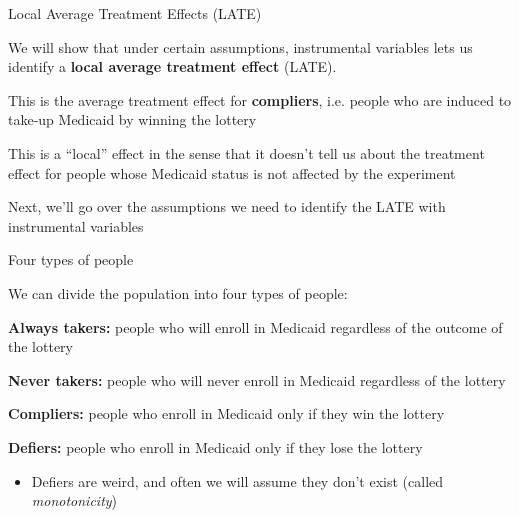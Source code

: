 \documentclass[11pt,english,handout]{beamer}
\newenvironment{wideitemize}{\itemize\addtolength{\itemsep}{10pt}}{\enditemize}
\begin{document}
	\begin{frame}{Local Average Treatment Effects (LATE)}
	
	
	\begin{wideitemize}

		\item
		We will show that under certain assumptions, instrumental variables lets us identify a \textbf{local average treatment effect} (LATE).
		
		\pause
		\item
		This is the average treatment effect for \textbf{compliers}, i.e. people who are induced to take-up Medicaid by winning the lottery
		
		\pause
		\item
		This is a ``local'' effect in the sense that it doesn't tell us about the treatment effect for people whose Medicaid status is not affected by the experiment

		\pause
		\item
		Next, we'll go over the assumptions we need to identify the LATE with instrumental variables
	\end{wideitemize}
		
	\end{frame}

\begin{frame}{Four types of people}

We can divide the population into four types of people:
	
	\begin{wideitemize}
		\item
		\textbf{Always takers:} people who will enroll in Medicaid regardless of the outcome of the lottery
		
		\pause
		\item  \textbf{Never takers:} people who will never enroll in Medicaid regardless of the lottery
		
		\pause
		\item \textbf{Compliers:} people who enroll in Medicaid only if they win the lottery
		
		\pause
		\item \textbf{Defiers:} people who enroll in Medicaid only if they lose the lottery
			\begin{itemize}
				\pause
				\item 
				Defiers are weird, and often we will assume they don't exist (called \textit{monotonicity})
			\end{itemize}
	\end{wideitemize}

\end{frame}
\end{document}
